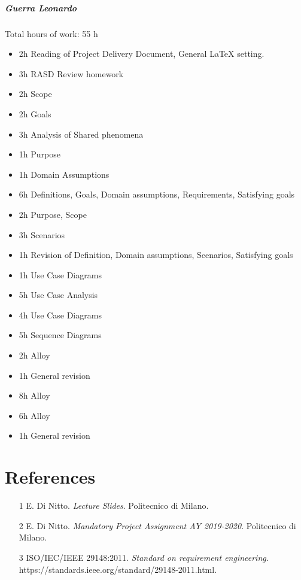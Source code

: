 \documentclass{report}
\newcommand{\ic}[1]{\textit{#1}}
\begin{document}
		\paragraph{Guerra Leonardo} Total hours of work: 55 h
			\begin{itemize}
				\item 2h Reading of Project Delivery Document, General LaTeX setting.
				\item 3h RASD Review homework
				\item 2h Scope
				\item 2h Goals
				\item 3h Analysis of Shared phenomena
				\item 1h Purpose
				\item 1h Domain Assumptions
				\item 6h Definitions, Goals, Domain assumptions, Requirements, Satisfying goals
				\item 2h Purpose, Scope
				\item 3h Scenarios
				\item 1h Revision of Definition, Domain assumptions, Scenarios, Satisfying goals
				\item 1h Use Case Diagrams
				\item 5h Use Case Analysis
				\item 4h Use Case Diagrams
				\item 5h Sequence Diagrams
				\item 2h Alloy
				\item 1h General revision
				\item 8h Alloy
				\item 6h Alloy
				\item 1h General revision
				
			\end{itemize}
	\chapter{References}
	\thispagestyle{fancy}
	\begin{itemize}
				\item[1]E. Di Nitto. \ic{Lecture Slides}. Politecnico di Milano.
				\item[2]E. Di Nitto. \ic{Mandatory Project Assignment AY 2019-2020}. Politecnico di Milano.
				\item[3]ISO/IEC/IEEE 29148:2011. \ic{Standard on requirement engineering}.\\https://standards.ieee.org/standard/29148-2011.html.
	\end{itemize}
	
\end{document}
